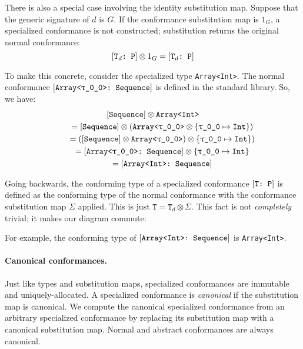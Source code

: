 \documentclass[../generics]{subfiles}
\begin{document}
There is also a special case involving the identity substitution map. Suppose that the generic signature of $d$ is $G$. If the conformance substitution map is $1_G$, a specialized conformance is not constructed; substitution returns the original normal conformance:
\[
[\texttt{$\texttt{T}_d$:~P}] \otimes 1_G = [\texttt{$\texttt{T}_d$:~P}]
\]

To make this concrete, consider the specialized type \texttt{Array<Int>}. The normal conformance $[\texttt{Array<\texttt{$\uptau$\_0\_0}>:~Sequence}]$ is defined in the standard library. So, we have:
\begin{gather*}
[\texttt{Sequence}]\otimes\texttt{Array<Int>}\\
\qquad {} = [\texttt{Sequence}]\otimes(\texttt{Array<\texttt{$\uptau$\_0\_0}>}\otimes\{\texttt{\texttt{$\uptau$\_0\_0}} \mapsto \texttt{Int}\})\\
\qquad {} = ([\texttt{Sequence}]\otimes\texttt{Array<\texttt{$\uptau$\_0\_0}>})\otimes\{\texttt{\texttt{$\uptau$\_0\_0}} \mapsto \texttt{Int}\})\\
\qquad {} = [\texttt{Array<\texttt{$\uptau$\_0\_0}>:~Sequence}]\otimes\{\texttt{\texttt{$\uptau$\_0\_0}} \mapsto \texttt{Int}\}\\
\qquad {} = [\texttt{Array<Int>:~Sequence}]
\end{gather*}

Going backwards, the conforming type of a specialized conformance $[\texttt{T:~P}]$ is defined as the conforming type of the normal conformance with the conformance substitution map $\Sigma$ applied. This is just $\texttt{T}=\texttt{T}_d\otimes\Sigma$. This fact is not \emph{completely} trivial; it makes our diagram commute:
\begin{quote}
\end{quote}
For example, the conforming type of $[\texttt{Array<Int>:~Sequence}]$ is \texttt{Array<Int>}.

\paragraph{Canonical conformances.}
Just like types and substitution maps, specialized conformances are immutable and uniquely-allocated. A specialized conformance is \emph{canonical} if the substitution map is canonical. We compute the canonical specialized conformance from an arbitrary specialized conformance by replacing its substitution map with a canonical substitution map. Normal and abstract conformances are always canonical.
\end{document}
